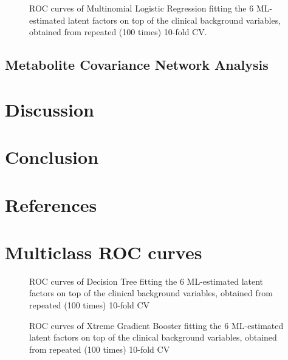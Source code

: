 \documentclass{amsart}
\begin{document}
\begin{figure}
  
  \caption{ROC curves of Multinomial Logistic Regression fitting the 6 ML-estimated latent factors on top of the clinical background variables, obtained from repeated (100 times) 10-fold CV.}
  \label{roc:6mlogit}
\end{figure}
\clearpage
\subsection{Metabolite Covariance Network Analysis}

\clearpage
\section{Discussion}

\clearpage
\section{Conclusion}






\newpage
\section*{References}
\printbibliography[heading=none]
\clearpage
\appendix 
\section{Multiclass ROC curves}
\begin{figure}[htb]
  
  \caption{ROC curves of Decision Tree fitting the 6 ML-estimated latent factors on top of the clinical background variables, obtained from repeated (100 times) 10-fold CV}
  \label{roc:tree}
  
  \caption{ROC curves of Xtreme Gradient Booster fitting the 6 ML-estimated latent factors on top of the clinical background variables, obtained from repeated (100 times) 10-fold CV}
  \label{roc:xgb}
  \end{figure}
\end{document}
